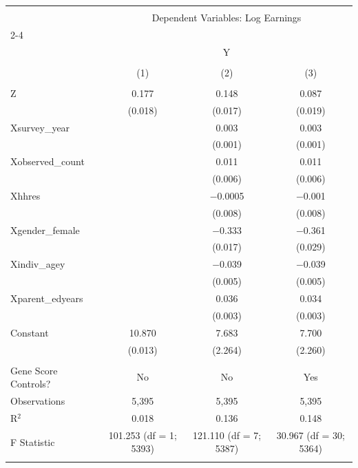 
\begin{tabular}{@{\extracolsep{5pt}}lccc} 
\\[-1.8ex]\hline 
\hline \\[-1.8ex] 
 & \multicolumn{3}{c}{Dependent Variables: Log Earnings} \\ 
\cline{2-4} 
\\[-1.8ex] & \multicolumn{3}{c}{Y} \\ 
\\[-1.8ex] & (1) & (2) & (3)\\ 
\hline \\[-1.8ex] 
 Z & 0.177 & 0.148 & 0.087 \\ 
  & (0.018) & (0.017) & (0.019) \\ 
  Xsurvey\_year &  & 0.003 & 0.003 \\ 
  &  & (0.001) & (0.001) \\ 
  Xobserved\_count &  & 0.011 & 0.011 \\ 
  &  & (0.006) & (0.006) \\ 
  Xhhres &  & $-$0.0005 & $-$0.001 \\ 
  &  & (0.008) & (0.008) \\ 
  Xgender\_female &  & $-$0.333 & $-$0.361 \\ 
  &  & (0.017) & (0.029) \\ 
  Xindiv\_agey &  & $-$0.039 & $-$0.039 \\ 
  &  & (0.005) & (0.005) \\ 
  Xparent\_edyears &  & 0.036 & 0.034 \\ 
  &  & (0.003) & (0.003) \\ 
  Constant & 10.870 & 7.683 & 7.700 \\ 
  & (0.013) & (2.264) & (2.260) \\ 
 \hline \\[-1.8ex] 
Gene Score Controls? & No & No & Yes \\ 
Observations & 5,395 & 5,395 & 5,395 \\ 
R$^{2}$ & 0.018 & 0.136 & 0.148 \\ 
F Statistic & 101.253 (df = 1; 5393) & 121.110 (df = 7; 5387) & 30.967 (df = 30; 5364) \\ 
\hline 
\hline \\[-1.8ex] 
\end{tabular} 
